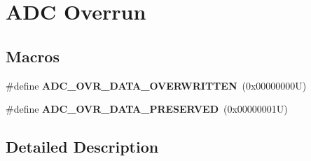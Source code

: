 \hypertarget{group___a_d_c___overrun}{}\section{A\+DC Overrun}
\label{group___a_d_c___overrun}
\subsection*{Macros}
\begin{DoxyCompactItemize}
\item 
\mbox{\label{group___a_d_c___overrun_gaeafc365762736ea8b5d73ba8c163548a}} 
\#define {\bfseries A\+D\+C\+\_\+\+O\+V\+R\+\_\+\+D\+A\+T\+A\+\_\+\+O\+V\+E\+R\+W\+R\+I\+T\+T\+EN}~(0x00000000\+U)
\item 
\mbox{\label{group___a_d_c___overrun_ga5e6fdbe9cab7436c3bf4551944c5c04d}} 
\#define {\bfseries A\+D\+C\+\_\+\+O\+V\+R\+\_\+\+D\+A\+T\+A\+\_\+\+P\+R\+E\+S\+E\+R\+V\+ED}~(0x00000001\+U)
\end{DoxyCompactItemize}


\subsection{Detailed Description}
